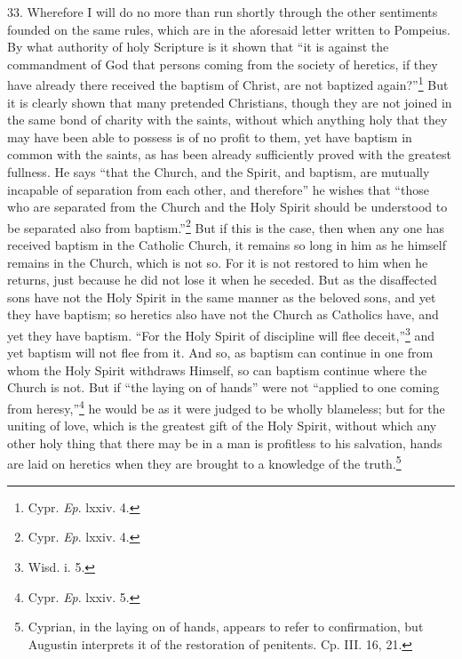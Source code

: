 33. Wherefore I will do no more than run shortly through the other sentiments founded on the same rules, which are in the aforesaid letter written to Pompeius. By what authority of holy Scripture is it shown that ``it is against the commandment of God that persons coming from the society of heretics, if they have already there received the baptism of Christ, are not baptized again?''\footnote{\par  Cypr. \emph{Ep}. lxxiv. 4.} But it is clearly shown that many pretended Christians, though they are not joined in the same bond of charity with the saints, without which anything holy that they may have been able to possess is of no profit to them, yet have baptism in common with the saints, as has been already sufficiently proved with the greatest fullness. He says ``that the Church, and the Spirit, and baptism, are mutually incapable of separation from each other, and therefore'' he wishes that ``those who are separated from the Church and the Holy Spirit should be understood to be separated also from baptism.''\footnote{\par  Cypr. \emph{Ep}. lxxiv. 4.} But if this is the case, then when any one has received baptism in the Catholic Church, it remains so long in him as he himself remains in the Church, which is not so. For it is not restored to him when he returns, just because he did not lose it when he seceded. But as the disaffected sons have not the Holy Spirit in the same manner as the beloved sons, and yet they have baptism; so heretics also have not the Church as Catholics have, and yet they have baptism. ``For the Holy Spirit of discipline will flee deceit,''\footnote{\par  Wisd. i. 5.} and yet baptism will not flee from it. And so, as baptism can continue in one from whom the Holy Spirit withdraws Himself, so can baptism continue where the Church is not. But if ``the laying on of hands'' were not ``applied to one coming from heresy,''\footnote{\par  Cypr. \emph{Ep}. lxxiv. 5.} he would be as it were judged to be wholly blameless; but for the uniting of love, which is the greatest gift of the Holy Spirit, without which any other holy thing that there may be in a man is profitless to his salvation, hands are laid on heretics when they are brought to a knowledge of the truth.\footnote{\par  Cyprian, in the laying on of hands, appears to refer to confirmation, but Augustin interprets it of the restoration of penitents. Cp. III. 16, 21.}

